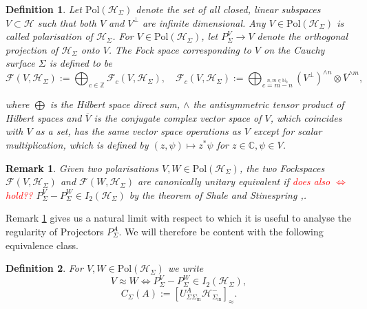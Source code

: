 \documentclass[a4paper,11pt]{article}
\newtheorem{de}{Definition}
\newtheorem{rmk}{Remark}
\begin{document}
\begin{de}
Let \(\text{Pol} (\mathcal{H}_\Sigma)\) denote the set of all closed, linear subspaces \(V\subset \mathcal{H}\)
such that both \(V\) and \(V^\perp\) are infinite dimensional. Any \(V\in \text{Pol}(\mathcal{H}_\Sigma)\) is called 
\emph{polarisation} of \(\mathcal{H}_\Sigma\). For \(V\in \text{Pol}(\mathcal{H}_\Sigma)\), let \(P_\Sigma^V\rightarrow V\) 
denote the orthogonal projection of \(\mathcal{H}_\Sigma\) onto \(V\).
The Fock space corresponding to \(V\) on the Cauchy surface \(\Sigma\) is defined to be
\begin{equation}
\mathcal{F}(V,\mathcal{H}_\Sigma) := \bigoplus_{c\in\mathbb{Z}} \mathcal{F}_c (V,\mathcal{H}_\Sigma), \quad 
\mathcal{F}_c(V,\mathcal{H}_\Sigma):= \bigoplus_{\overset{n,m\in\mathbb{N}_0}{c=m-n}}(V^\perp)^{\wedge n} \otimes \overline{V}^{\wedge m},
\end{equation}

where \(\bigoplus\) is the Hilbert space direct sum, \(\wedge\) the antisymmetric tensor product of Hilbert spaces and 
\(\overline{V}\) is the conjugate complex vector space of \(V\), which coincides with \(V\) as a set, has the same vector 
space operations as \(V\) except for scalar multiplication, which is defined by \((z,\psi)\mapsto z^* \psi\) for 
\(z\in\mathbb{C},\psi\in V\).
\end{de}

\begin{rmk}\label{WhyUseApprox}
Given two polarisations \(V,W\in \text{Pol}(\mathcal{H}_\Sigma)\), the two Fockspaces \(\mathcal{F}(V,\mathcal{H}_\Sigma)\) and 
\(\mathcal{F}(W,\mathcal{H}_\Sigma)\) are canonically unitary equivalent if \textcolor{red}{does also \(\iff\)  hold??} 
\(P^V_\Sigma - P^W_\Sigma \in I_2(\mathcal{H}_\Sigma)\) by the theorem of Shale and Stinespring 
\cite{Shale Stinespring 1965},.
\end{rmk}
Remark \ref{WhyUseApprox} gives us a natural limit with 
respect to which it is useful
to analyse the regularity of Projectors \(P_\Sigma^A\). We will therefore be content with the following equivalence class.
\begin{de}
For \(V,W\in \text{Pol}(\mathcal{H}_\Sigma)\) we write
\begin{equation}
V\approx W \iff P^V_\Sigma - P^W_\Sigma \in I_2(\mathcal{H}_\Sigma),
\end{equation}
\begin{equation}
C_\Sigma (A):= [ U_{\Sigma \Sigma_{\text{in}}}^A \mathcal{H}_{\Sigma_{\text{in}}}^-]_\approx.
\end{equation}
\end{de}
\end{document}
